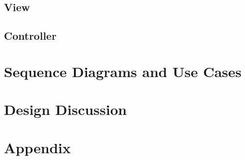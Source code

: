 \documentclass[a4paper]{article}
\begin{document}
\subsection{View}

\subsection{Controller}

\pagebreak
\section{Sequence Diagrams and Use Cases}

\pagebreak
\section{Design Discussion}

\pagebreak

\section{Appendix}

\appendix
\end{document}

